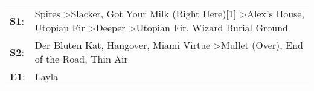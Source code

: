 \begin{supertabular}{p{0.03\textwidth}p{0.92\textwidth}}
 \textbf{S1}:  &  Spires\textsuperscript{} \textgreater \enspace Slacker\textsuperscript{}, \enspace Got Your Milk (Right Here)[1]\textsuperscript{} \textgreater \enspace Alex's House\textsuperscript{}, \enspace Utopian Fir\textsuperscript{} \textgreater \enspace Deeper\textsuperscript{} \textgreater \enspace Utopian Fir\textsuperscript{}, \enspace Wizard Burial Ground\textsuperscript{}  \enspace  \\
 \textbf{S2}:  &                                                                                                                                Der Bluten Kat\textsuperscript{}, \enspace Hangover\textsuperscript{}, \enspace Miami Virtue\textsuperscript{} \textgreater \enspace Mullet (Over)\textsuperscript{}, \enspace End of the Road\textsuperscript{}, \enspace Thin Air\textsuperscript{}  \enspace  \\
 \textbf{E1}:  &                                                                                                                                                                                                                                                                                                                                                              Layla\textsuperscript{}  \enspace  \\
\end{supertabular}
